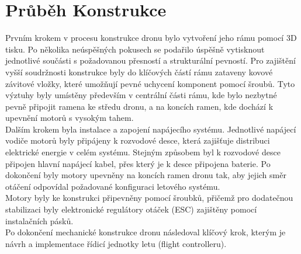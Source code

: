 \documentclass[12pt]{report}
\begin{document}
\chapter{Průběh Konstrukce}
Prvním krokem v procesu konstrukce dronu bylo vytvoření jeho rámu pomocí 3D tisku. Po několika neúspěšných pokusech se podařilo úspěšně vytisknout jednotlivé součásti s požadovanou přesností a strukturální pevností. Pro zajištění vyšší soudržnosti konstrukce byly do klíčových částí rámu zataveny kovové závitové vložky, které umožňují pevné uchycení komponent pomocí šroubů. Tyto výztuhy byly umístěny především v centrální části rámu, kde bylo nezbytné pevně připojit ramena ke středu dronu, a na koncích ramen, kde dochází k upevnění motorů s vysokým tahem.\\
Dalším krokem byla instalace a zapojení napájecího systému. Jednotlivé napájecí vodiče motorů byly připájeny k rozvodové desce, která zajišťuje distribuci elektrické energie v celém systému. Stejným způsobem byl k rozvodové desce připojen hlavní napájecí kabel, přes který je k desce připojena baterie. Po dokončení byly motory upevněny na koncích ramen dronu tak, aby jejich směr otáčení odpovídal požadované konfiguraci letového systému.\\
Motory byly ke konstrukci připevněny pomocí šroubků, přičemž pro dodatečnou stabilizaci byly elektronické regulátory otáček (ESC) zajištěny pomocí instalačních pásků.\\
Po dokončení mechanické konstrukce dronu následoval klíčový krok, kterým je návrh a implementace řídicí jednotky letu (flight controlleru).
\end{document}
